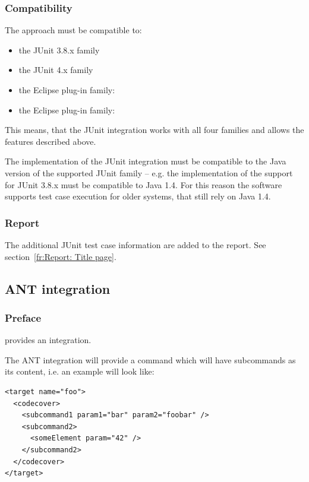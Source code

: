 \subsubsection{Compatibility}
The approach must be compatible to:
\begin{itemize}
  \item the JUnit 3.8.x family
  \item the JUnit 4.x family
  \item the Eclipse plug-in family: 
  \item the Eclipse plug-in family: 
\end{itemize}
This means, that the JUnit integration works with all four families and allows the features described above.
\par
The implementation of the JUnit integration must be compatible to the Java version of the supported JUnit family -- e.g. the implementation of the support for JUnit 3.8.x must be compatible to Java 1.4. For this reason the software supports test case execution for older systems, that still rely on Java 1.4.

\subsubsection{Report}
The additional JUnit test case information are added to the report. See section~\ref{fr:Report: Title page}.



\subsection{ANT integration} \label{fr:ANT integration} 
\subsubsection{Preface}

\gbt provides an
integration.


The \gbt ANT integration will provide a  command which will
have subcommands as its content, i.e. an example will look like:

\begin{verbatim}
<target name="foo">
  <codecover>
    <subcommand1 param1="bar" param2="foobar" />
    <subcommand2>
      <someElement param="42" />
    </subcommand2>
  </codecover>
</target>
\end{verbatim}

